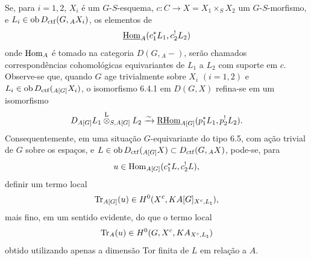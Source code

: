 Se, para $i=1,2$, $X_i$ é um $G$-$S$-esquema, $c:C\to X=X_1\times_SX_2$ um $G$-$S$-morfismo, e $L_i\in\operatorname{ob} D_{\mathrm{ctf}}(G,{}_AX_i)$, os elementos de
\[
\underline{\operatorname{Hom}}_A(c_1^*L_1,c_2^!L_2)
\]
onde $\operatorname{Hom}_A$ é tomado na categoria $D(G,{}_A-)$, serão chamados correspondências cohomológicas equivariantes de $L_1$ a $L_2$ com suporte em $c$. Observe-se que, quando $G$ age trivialmente sobre $X_i$ $(i=1,2)$ e $L_i\in\operatorname{ob} D_{\mathrm{ctf}}({}_{A[G]}X_i)$, o isomorfismo 6.4.1 em $D(G,X)$ refina-se em um isomorfismo
\[
D_{A[G]}L_1\overset{\mathrm L}{\otimes}_{S,A[G]}L_2
\xrightarrow{\sim}
\underline{\mathrm{RHom}}_{A[G]}(p_1^*L_1,p_2^!L_2).
\]
Consequentemente, em uma situação $G$-equivariante do tipo 6.5, com ação trivial de $G$ sobre os espaços, e $L\in\operatorname{ob} D_{\mathrm{ctf}}({}_{A[G]}X)\subset D_{\mathrm{ctf}}(G,{}_AX)$, pode-se, para
\[
u\in\operatorname{Hom}_{A[G]}(c_1^*L,c_2^!L),
\]
definir um termo local
\[
\operatorname{Tr}_{A[G]}(u)\in H^0(X^c,KA[G]_{X^c,L_{\natural}}),
\]
mais fino, em um sentido evidente, do que o termo local
\[
\operatorname{Tr}_A(u)\in H^0(G,X^c,KA_{X^c,L_{\natural}})
\]
obtido utilizando apenas a dimensão Tor finita de $L$ em relação a $A$.
